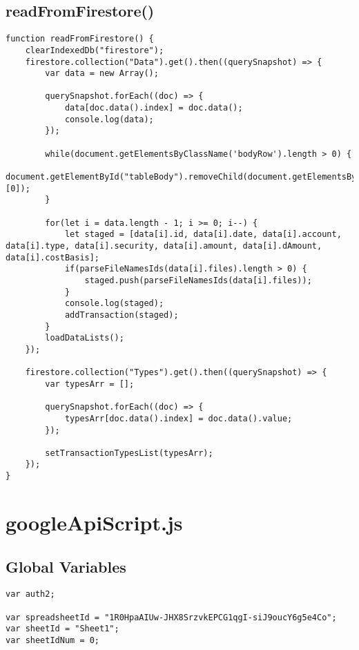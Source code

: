 \documentclass[letterpaper]{article}
\begin{document}
\subsection{readFromFirestore()}

\begin{lstlisting}[firstnumber=126]
function readFromFirestore() {
    clearIndexedDb("firestore");
    firestore.collection("Data").get().then((querySnapshot) => {
        var data = new Array();

        querySnapshot.forEach((doc) => {
            data[doc.data().index] = doc.data();
            console.log(data);
        });

        while(document.getElementsByClassName('bodyRow').length > 0) {
            document.getElementById("tableBody").removeChild(document.getElementsByClassName('bodyRow')[0]);
        }

        for(let i = data.length - 1; i >= 0; i--) {
            let staged = [data[i].id, data[i].date, data[i].account, data[i].type, data[i].security, data[i].amount, data[i].dAmount, data[i].costBasis];
            if(parseFileNamesIds(data[i].files).length > 0) {
                staged.push(parseFileNamesIds(data[i].files));
            }
            console.log(staged);
            addTransaction(staged);
        }
        loadDataLists();
    });

    firestore.collection("Types").get().then((querySnapshot) => {
        var typesArr = [];

        querySnapshot.forEach((doc) => {
            typesArr[doc.data().index] = doc.data().value;
        });

        setTransactionTypesList(typesArr);
    });
}
\end{lstlisting}

\newpage

\section{googleApiScript.js}

\subsection{Global Variables}

\begin{lstlisting}[firstnumber=1]
var auth2;

var spreadsheetId = "1R0HpaAIUw-JHX8SrzvkEPCG1qgI-siJ9oucY6g5e4Co";
var sheetId = "Sheet1";
var sheetIdNum = 0;
\end{lstlisting}
\end{document}
